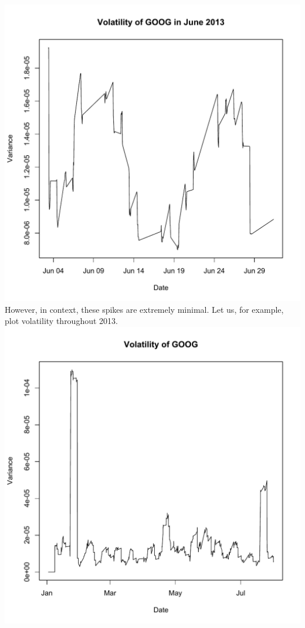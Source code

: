 \documentclass[11pt]{amsart}
\begin{document}
\includegraphics[scale=0.4]{goog_vol_zoom_11_25.pdf} \\

However, in context, these spikes are extremely minimal. Let us, for example, plot volatility throughout 2013. \\

\includegraphics[scale=0.4]{goog_vol_11_25.pdf} \\
\end{document}
